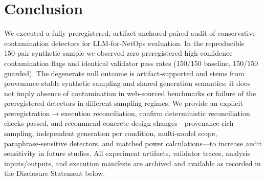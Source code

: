 \documentclass[conference]{IEEEtran}
\begin{document}
\section{Conclusion}
We executed a fully preregistered, artifact‑anchored paired audit of conservative contamination detectors for LLM‑for‑NetOps evaluation. In the reproducible 150‑pair synthetic sample we observed zero preregistered high‑confidence contamination flags and identical validator pass rates (150/150 baseline, 150/150 guarded). The degenerate null outcome is artifact‑supported and stems from provenance‑stable synthetic sampling and shared generation semantics; it does not imply absence of contamination in web‑sourced benchmarks or failure of the preregistered detectors in different sampling regimes. We provide an explicit preregistration\ensuremath{\rightarrow}execution reconciliation, confirm deterministic reconciliation checks passed, and recommend concrete design changes---provenance‑rich sampling, independent generation per condition, multi‑model scope, paraphrase‑sensitive detectors, and matched power calculations---to increase audit sensitivity in future studies. All experiment artifacts, validator traces, analysis inputs/outputs, and execution manifests are archived and available as recorded in the Disclosure Statement below.
\end{document}
